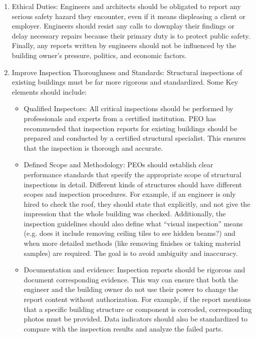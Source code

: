 \documentclass[12pt]{article}
\begin{document}
\begin{enumerate}
    \item Ethical Duties: Engineers and architects should be obligated to report any serious safety hazard they encounter, even if it means displeasing a client or employer. Engineers should resist any calls to downplay their findings or delay necessary repairs because their primary duty is to protect public safety. Finally, any reports written by engineers should not be influenced by the building owner’s pressure, politics, and economic factors.
    
    \item Improve Inspection Thoroughness and Standards: Structural inspections of existing buildings must be far more rigorous and standardized. Some Key elements should include:
    \begin{itemize}
        \item Qualified Inspectors: All critical inspections should be performed by professionals and experts from a certified institution. PEO has recommended that inspection reports for existing buildings should be prepared and conducted by a certified structural specialist. This ensures that the inspection is thorough and accurate.
        
        \item Defined Scope and Methodology: PEOs should establish clear performance standards that specify the appropriate scope of structural inspections in detail. Different kinds of structures should have different scopes and inspection procedures. For example, if an engineer is only hired to check the roof, they should state that explicitly, and not give the impression that the whole building was checked. Additionally, the inspection guidelines should also define what “visual inspection” means (e.g. does it include removing ceiling tiles to see hidden beams?) and when more detailed methods (like removing finishes or taking material samples) are required. The goal is to avoid ambiguity and inaccuracy.

        \item Documentation and evidence: Inspection reports should be rigorous and document corresponding evidence. This way can ensure that both the engineer and the building owner do not use their power to change the report content without authorization. For example, if the report mentions that a specific building structure or component is corroded, corresponding photos must be provided. Data indicators should also be standardized to compare with the inspection results and analyze the failed parts.


\end{itemize}
\end{enumerate}
\end{document}
